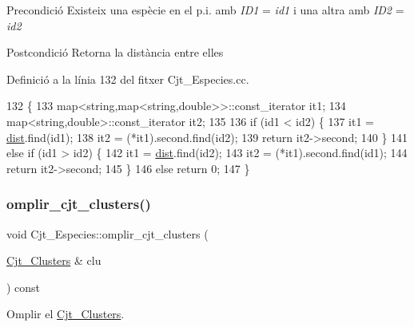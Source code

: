 \begin{DoxyPrecond}{Precondició}
Existeix una espècie en el p.\+i. amb {\itshape I\+D1} = {\itshape id1} i una altra amb {\itshape I\+D2} = {\itshape id2} 
\end{DoxyPrecond}
\begin{DoxyPostcond}{Postcondició}
Retorna la distància entre elles 
\end{DoxyPostcond}


Definició a la línia 132 del fitxer Cjt\+\_\+\+Especies.\+cc.


\begin{DoxyCode}
132                                                                      \{
133     map<string,map<string,double>>::const\_iterator it1;
134     map<string,double>::const\_iterator it2;
135     
136     \textcolor{keywordflow}{if} (id1 < id2) \{
137         it1 = \hyperlink{class_cjt___especies_aaf5d15b706e8b0c5b910283d60ef58a6}{dist}.find(id1);
138         it2 = (*it1).second.find(id2);
139         \textcolor{keywordflow}{return} it2->second;
140     \}
141     \textcolor{keywordflow}{else} \textcolor{keywordflow}{if} (id1 > id2) \{
142         it1 = \hyperlink{class_cjt___especies_aaf5d15b706e8b0c5b910283d60ef58a6}{dist}.find(id2);
143         it2 = (*it1).second.find(id1);
144         \textcolor{keywordflow}{return} it2->second;
145     \}
146     \textcolor{keywordflow}{else} \textcolor{keywordflow}{return} 0;
147 \}
\end{DoxyCode}
\mbox{\label{class_cjt___especies_a311090cf3df21cf719ab4419a662d9aa}} 
\subsubsection{\texorpdfstring{omplir\+\_\+cjt\+\_\+clusters()}{omplir\_cjt\_clusters()}}
{\footnotesize\ttfamily void Cjt\+\_\+\+Especies\+::omplir\+\_\+cjt\+\_\+clusters (\begin{DoxyParamCaption}\item[{\hyperlink{class_cjt___clusters}{Cjt\+\_\+\+Clusters} \&}]{clu }\end{DoxyParamCaption}) const}



Omplir el \hyperlink{class_cjt___clusters}{Cjt\+\_\+\+Clusters}. 

